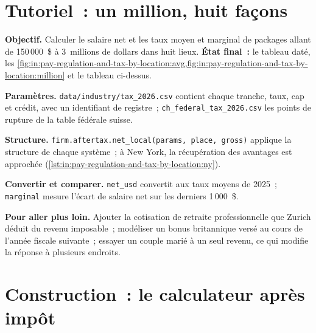 \section{Tutoriel~: un million, huit façons}\label{tut:in:pay-regulation-and-tax-by-location:tut}

\begin{tutorial}
\textbf{Objectif.} Calculer le salaire net et les taux moyen et marginal de packages allant de 150\,000~\$ à 3~millions de dollars dans huit
lieux. \textbf{État final~:} le tableau daté,
les \cref{fig:in:pay-regulation-and-tax-by-location:avg,fig:in:pay-regulation-and-tax-by-location:million} et le tableau ci-dessus.
\begin{tutsteps}
\item \textbf{Paramètres.} \texttt{data/industry/tax\_2026.csv} contient chaque tranche, taux, cap et crédit, avec un identifiant de registre~;
\texttt{ch\_federal\_tax\_2026.csv} les points de rupture de la table fédérale suisse.
\item \textbf{Structure.} \texttt{firm.aftertax.net\_local(params, place, gross)} applique la structure de chaque système~; à New York, la récupération des
avantages est approchée (\cref{lst:in:pay-regulation-and-tax-by-location:ny}).
\label{lst:in:pay-regulation-and-tax-by-location:ny}
\item \textbf{Convertir et comparer.} \texttt{net\_usd} convertit aux taux moyens de 2025~; \texttt{marginal} mesure
l'écart de salaire net sur les derniers 1\,000~\$.
\end{tutsteps}
\end{tutorial}

\textbf{Pour aller plus loin.} Ajouter la cotisation de retraite professionnelle que Zurich déduit du revenu imposable~; modéliser un
bonus britannique versé au cours de l'année fiscale suivante~; essayer un couple marié à un seul revenu, ce qui modifie la réponse à plusieurs endroits.

\section{Construction~: le calculateur après impôt}\label{bld:in:pay-regulation-and-tax-by-location:aftertax}

